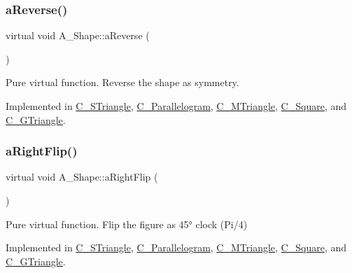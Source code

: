 \subsubsection{\texorpdfstring{a\+Reverse()}{aReverse()}}
{\footnotesize\ttfamily virtual void A\+\_\+\+Shape\+::a\+Reverse (\begin{DoxyParamCaption}{ }\end{DoxyParamCaption})\hspace{0.3cm}{\ttfamily [pure virtual]}}



Pure virtual function. Reverse the shape as symmetry. 



Implemented in \hyperlink{classC__STriangle_a5402899ec4ea0de3ca3e7aa6f184a1c7}{C\+\_\+\+S\+Triangle}, \hyperlink{classC__Parallelogram_a573447294989d53fadf3d7adfb0640c6}{C\+\_\+\+Parallelogram}, \hyperlink{classC__MTriangle_a44614f4abb94f1a5f963cfb3e8fce7a5}{C\+\_\+\+M\+Triangle}, \hyperlink{classC__Square_a961d1f5c49a45459668744d459863bd2}{C\+\_\+\+Square}, and \hyperlink{classC__GTriangle_a479646fa1265aaf2299b59787c394a27}{C\+\_\+\+G\+Triangle}.

\mbox{\label{classA__Shape_a892688cbbad3297e00e87cce0dbfc76d}} 
\subsubsection{\texorpdfstring{a\+Right\+Flip()}{aRightFlip()}}
{\footnotesize\ttfamily virtual void A\+\_\+\+Shape\+::a\+Right\+Flip (\begin{DoxyParamCaption}{ }\end{DoxyParamCaption})\hspace{0.3cm}{\ttfamily [pure virtual]}}



Pure virtual function. Flip the figure as 45° clock (Pi/4) 



Implemented in \hyperlink{classC__STriangle_aa3cad7b7367c253000cf0f91f55ba600}{C\+\_\+\+S\+Triangle}, \hyperlink{classC__Parallelogram_ab638d55c999ea10da7b5000fd034fbc1}{C\+\_\+\+Parallelogram}, \hyperlink{classC__MTriangle_aa3a1fc0604fa7e13b6c89d242357a163}{C\+\_\+\+M\+Triangle}, \hyperlink{classC__Square_a0ea2df0d283ee4ffa911163e55a0a637}{C\+\_\+\+Square}, and \hyperlink{classC__GTriangle_aa4f808a02ae18bd36c205a5d70eb3fef}{C\+\_\+\+G\+Triangle}.

